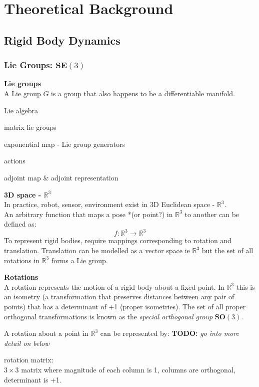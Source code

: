 \section{Theoretical Background}

\subsection{Rigid Body Dynamics}
	\subsubsection{Lie Groups: $\textbf{SE}(3)$}		
		\textbf{Lie groups}\\
		A Lie group $G$ is a group that also happens to be a differentiable manifold.
		
		Lie algebra
		
		matrix lie groups
		
		exponential map - Lie group generators
		
		actions
		
		adjoint map \& adjoint representation
		
		\textbf{3D space - $\mathbb{R}^3$}\\
		In practice, robot, sensor, environment exist in 3D Euclidean space - $\mathbb{R}^3$.\\
		An arbitrary function that maps a pose *(or point?) in $\mathbb{R}^3$ to another can be defined as:
		\begin{equation}
		f: \mathbb{R}^3 \rightarrow \mathbb{R}^3
		\end{equation}
		To represent rigid bodies, require mappings corresponding to rotation and translation. Translation can be modelled as a vector space ie $\mathbb{R}^3$ but the set of all rotations in $\mathbb{R}^3$ forms a Lie group.
		
		\textbf{Rotations}\\
		A rotation represents the motion of a rigid body about a fixed point. In $\mathbb{R}^3$ this is an isometry (a transformation that preserves distances between any pair of points) that has a determinant of +1 (proper isometries). The set of all proper orthogonal transformations is known as the \textit{special orthogonal group} $\textbf{SO}(3)$.
		
		A rotation about a point in $\mathbb{R}^3$ can be represented by: \textbf{TODO:} \textit{go into more detail on below}
		
		rotation matrix:\\
		$3\times3$ matrix where magnitude of each column is 1, columns are orthogonal, determinant is +1.
		
